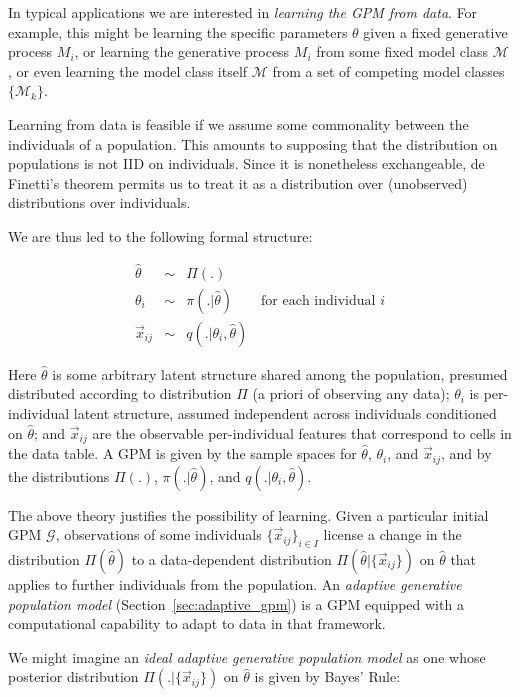 \documentclass[10pt,letterpaper]{article}
\newcommand{\set}[1]{\{#1\}}
\begin{document}
In typical applications we are interested in \textit{learning
the GPM from data}. For example, this might be learning the specific
parameters $\theta$ given a fixed generative process $M_i$, or learning the
generative process $M_i$ from some fixed model class $\mathcal{M}$, or even
learning the model class itself $\mathcal{M}$ from a set of competing model
classes $\set{\mathcal{M}_k}$.

Learning from data is feasible if we assume some commonality between
the individuals of a population.  This amounts to supposing that the
distribution on populations is not IID on individuals.  Since it
is nonetheless exchangeable, de Finetti's theorem 
permits us to treat it as a distribution over (unobserved) distributions
over individuals.

We are thus led to the following formal structure:

\begin{eqnarray*}
\hat{\theta} & \sim & \Pi(.) \\
\theta_i & \sim & \pi(.|\hat\theta) \qquad \textrm{for each individual $i$} \\
\vec{x}_{ij} & \sim & q(.|\theta_i, \hat\theta)
\end{eqnarray*}

Here $\hat\theta$ is some arbitrary latent structure shared among the
population, presumed distributed according to distribution $\Pi$ (a
priori of observing any data); $\theta_i$ is per-individual latent
structure, assumed independent across individuals conditioned on
$\hat\theta$; and $\vec{x}_{ij}$ are the observable per-individual
features that correspond to cells in the data table.  A GPM is given by the
sample spaces for $\hat\theta$, $\theta_i$, and $\vec{x}_{ij}$, and by the
distributions $\Pi(.)$, $\pi(.|\hat\theta)$, and $q(.|\theta_i, \hat\theta)$.

The above theory justifies the possibility of learning.  Given a
particular initial GPM $\mathcal{G}$, observations of some individuals
$\{\vec{x}_{ij}\}_{i \in I}$ license a change in the distribution
$\Pi(\hat\theta)$ to a data-dependent distribution
$\Pi(\hat\theta|\{\vec{x}_{ij}\})$ on $\hat\theta$ that applies to
further individuals from the population.  An \emph{adaptive generative
  population model} (Section~\ref{sec:adaptive_gpm}) is a GPM equipped
with a computational capability to adapt to data in that framework.

We might imagine an \emph{ideal adaptive generative population model}
as one whose posterior distribution $\Pi(.|\{\vec{x}_{ij}\})$ on
$\hat\theta$ is given by Bayes' Rule:
\end{document}
